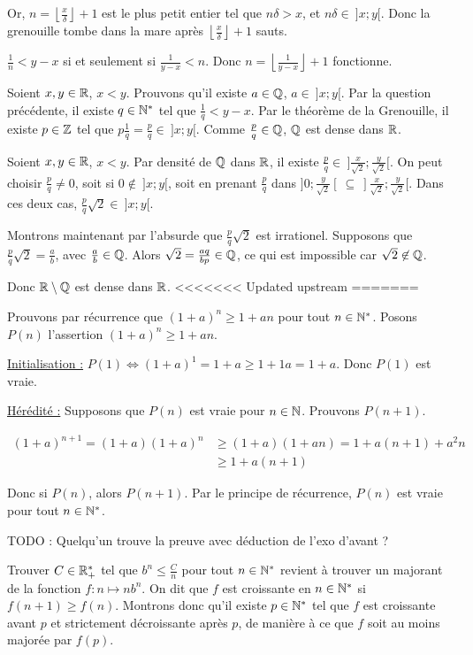 \documentclass[]{../templates/homework}
\providecommand{\floor}[1]{\left \lfloor #1 \right \rfloor }
\begin{document}
Or, $n = \floor {\frac x \delta} + 1$ est le plus petit entier tel que $n\delta > x$, et $n\delta \in\ ]x;y[$. Donc la grenouille tombe dans la mare après $\floor {\frac x \delta} + 1$ sauts.

\subproblem
\question $\frac 1 n < y-x$ si et seulement si $\frac 1 {y-x} < n$. Donc $n=\floor {\frac 1 {y-x}} + 1$ fonctionne.

\question Soient $x,y \in \mathbb R$, $x<y$. Prouvons qu'il existe $a\in\mathbb Q$, $a\in\ ]x;y[$.
Par la question précédente, il existe $q\in \mathbb N^*$ tel que $\frac 1 q < y-x$. Par le théorème de la Grenouille, il existe $p \in \mathbb Z$ tel que $p \frac 1 q = \frac p q \in \ ]x;y[$. Comme $\frac p q \in \mathbb Q$, $\mathbb Q$ est dense dans $\mathbb R$.

\question Soient $x,y \in \mathbb R$, $x<y$. Par densité de $\mathbb Q$ dans $\mathbb R$, il existe $\frac p q \in\ ]\frac x {\sqrt 2}; \frac y {\sqrt 2}[$. On peut choisir $\frac p q \neq 0$, soit si $0\not \in\ ]x;y[$, soit en prenant $\frac p q$ dans $]0;\frac y {\sqrt 2}[\ \subseteq\ ]\frac x {\sqrt 2}; \frac y {\sqrt 2}[$. Dans ces deux cas, $\frac p q \sqrt 2 \in\ ]x;y[$.

Montrons maintenant par l'absurde que $\frac p q \sqrt 2$ est irrationel. Supposons que $\frac p q \sqrt 2 = \frac a b$, avec $\frac a b \in \mathbb Q$. Alors $\sqrt 2 = \frac {aq} {bp} \in \mathbb Q$, ce qui est impossible car $\sqrt 2 \not \in \mathbb Q$.

Donc $\mathbb R \setminus \mathbb Q$ est dense dans $\mathbb R$.
<<<<<<< Updated upstream
=======

\subproblem
\question Prouvons par récurrence que $(1+a)^n \geq 1+an$ pour tout $n \in \mathbb N^*$. Posons $P(n)$ l'assertion $(1+a)^n\geq 1+an$.

\underline{Initialisation :} $P(1) \iff (1+a)^1 = 1+a \geq 1+ 1a = 1+a$. Donc $P(1)$ est vraie.

\underline{Hérédité :} Supposons que $P(n)$ est vraie pour $n\in\mathbb N$. Prouvons $P(n+1)$.

\begin{align*}
	(1+a)^{n+1} = (1+a)(1+a)^n & \geq (1+a)(1+an) = 1 + a(n+1) + a^2n \\
	& \geq 1 + a(n+1)
\end{align*}

Donc si $P(n)$, alors $P(n+1)$. Par le principe de récurrence, $P(n)$ est vraie pour tout $n\in\mathbb N^*$.

\question TODO : Quelqu'un trouve la preuve avec déduction de l'exo d'avant ?

Trouver $C\in\mathbb R_+^*$ tel que $b^n \leq \frac C n$ pour tout $n\in\mathbb N^*$ revient à trouver un majorant de la fonction $f : n\mapsto nb^n$. On dit que $f$ est croissante en $n \in \mathbb N^*$ si $f(n+1) \geq f(n)$. Montrons donc qu'il existe $p\in\mathbb N^*$ tel que $f$ est croissante avant $p$ et strictement décroissante après $p$, de manière à ce que $f$ soit au moins majorée par $f(p)$.
\end{document}
